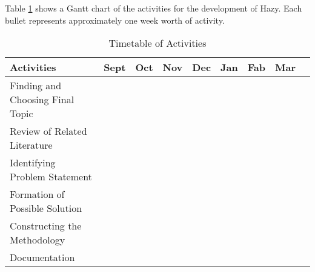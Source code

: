 Table \ref{tab:timetableactivities} shows a Gantt chart of the activities for the development of Hazy.  Each bullet represents approximately
one week worth of activity.

%
%
\newcommand{\weekone}{\textbullet}
\newcommand{\weektwo}{\textbullet \textbullet}
\newcommand{\weekthree}{\textbullet \textbullet \textbullet}
\newcommand{\weekfour}{\textbullet \textbullet \textbullet \textbullet}

%
%
\begin{comment}
   \newcommand{\weekone}{$\star$}
   \newcommand{\weektwo}{$\star \star$}
   \newcommand{\weekthree}{$\star \star \star$}
   \newcommand{\weekfour}{$\star \star \star \star$ }
\end{comment}



\begin{table}[ht]   %
\centering
\caption{Timetable of Activities} \vspace{0.25em}
\begin{tabular}{|p{2in}|c|c|c|c|c|c|c|c|} \hline
\centering Activities  & Sept  & Oct & Nov & Dec & Jan & Fab & Mar \\ \hline
Finding and Choosing Final Topic      & ~~~\weektwo &  &  &  &  &  &  \\ \hline
Review of Related Literature &   & \weekfour & \weekfour &  &  &  &  \\ \hline
Identifying Problem Statement     &  ~~~\weektwo &  \weekone~~~  &  & &  &  &  \\ \hline
Formation of Possible Solution    &   & ~~~\weektwo  &  \weekone~~~ &  & & &  \\ \hline
Constructing the Methodology     &   &  &   ~~~\weektwo & \weekthree ~~ & &  &  \\ \hline
Documentation & ~~~\weektwo  & \weekfour & \weekfour &\weekone ~~& &&~~~ \\ \hline
\end{tabular}
\label{tab:timetableactivities}
\end{table}

